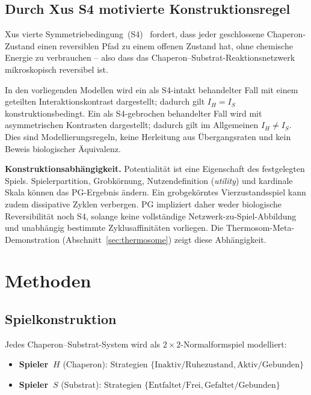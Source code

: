 \documentclass[12pt,a4paper]{article}
\begin{document}
\subsection{Durch Xus S4 motivierte Konstruktionsregel}

Xus vierte Symmetriebedingung~(S4)~\cite{Xu2022} fordert, dass jeder
geschlossene Chaperon-Zustand einen reversiblen Pfad zu einem offenen
Zustand hat, ohne chemische Energie zu verbrauchen -- also dass das
Chaperon--Substrat-Reaktionsnetzwerk mikroskopisch reversibel ist.

In den vorliegenden Modellen wird ein als S4-intakt behandelter Fall mit
einem geteilten Interaktionskontrast dargestellt; dadurch gilt
$I_H=I_S$ konstruktionsbedingt. Ein als S4-gebrochen behandelter Fall
wird mit asymmetrischen Kontrasten dargestellt; dadurch gilt im
Allgemeinen $I_H\neq I_S$. Dies sind Modellierungsregeln, keine
Herleitung aus Übergangsraten und kein Beweis biologischer Äquivalenz.

\textbf{Konstruktionsabhängigkeit.} Potentialität ist eine Eigenschaft
des festgelegten Spiels. Spielerpartition, Grobkörnung,
Nutzendefinition (\emph{utility}) und kardinale Skala können das PG-Ergebnis ändern.
Ein grobgekörntes Vierzustandsspiel kann zudem dissipative Zyklen
verbergen. PG impliziert daher weder biologische Reversibilität noch S4,
solange keine vollständige Netzwerk-zu-Spiel-Abbildung und unabhängig
bestimmte Zyklusaffinitäten vorliegen. Die Thermosom-Meta-Demonstration
(Abschnitt~\ref{sec:thermosome}) zeigt diese Abhängigkeit.


\section{Methoden}
\label{sec:methods}

\subsection{Spielkonstruktion}
\label{sec:game_construction}

Jedes Chaperon--Substrat-System wird als $2\times 2$-Normalformspiel
modelliert:
\begin{itemize}
  \item \textbf{Spieler~$H$} (Chaperon): Strategien
    $\{\text{Inaktiv/Ruhezustand}, \text{Aktiv/Gebunden}\}$
  \item \textbf{Spieler~$S$} (Substrat): Strategien
    $\{\text{Entfaltet/Frei}, \text{Gefaltet/Gebunden}\}$
\end{itemize}
\end{document}
